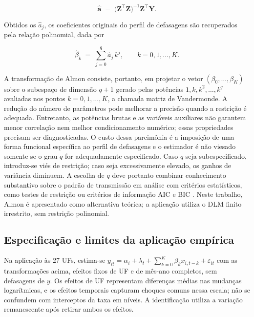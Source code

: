 \begin{equation}
    \hat{\boldsymbol{a}}
    \;=\;
    \bigl(\mathbf{Z}^{\!\top}\mathbf{Z}\bigr)^{-1}
    \mathbf{Z}^{\!\top}\mathbf{Y}.
    \label{eq:almon_ols}
\end{equation}
 
Obtidos os $\hat{a}_j$, os coeficientes originais do perfil de
defasagens são recuperados pela relação polinomial, dada por
 
\begin{equation}
    \hat{\beta}_k
    \;=\;
    \sum_{j=0}^{q} \hat{a}_j\, k^j,
    \qquad k = 0, 1, \ldots, K.
    \label{eq:almon_recovery}
\end{equation}
 
A transformação de Almon consiste, portanto, em projetar o vetor
$(\beta_0, \ldots, \beta_K)$ sobre o subespaço de dimensão $q + 1$
gerado pelas potências $1, k, k^2, \ldots, k^q$ avaliadas nos pontos
$k = 0, 1, \ldots, K$, a chamada matriz de Vandermonde. A redução do número de parâmetros pode melhorar a precisão quando a restrição é adequada. Entretanto, as potências brutas e as variáveis auxiliares não garantem menor correlação nem melhor condicionamento numérico; essas propriedades precisam ser diagnosticadas. O custo dessa parcimônia é a imposição
de uma forma funcional específica ao perfil de defasagens e o estimador
é não viesado somente se o grau $q$ for adequadamente especificado.
Caso $q$ seja subespecificado, introduz-se viés de restrição; caso
seja excessivamente elevado, os ganhos de variância diminuem. A
escolha de $q$ deve portanto combinar conhecimento substantivo sobre
o padrão de transmissão em análise com critérios estatísticos, como
testes de restrição ou critérios de informação AIC e BIC
\citep{judge1985, wooldridge2010}. Neste trabalho, Almon é apresentado como alternativa teórica; a aplicação utiliza o DLM finito irrestrito, sem restrição polinomial.


\subsection{Especificação e limites da aplicação empírica}
Na aplicação às 27 UFs, estima-se $y_{it}=\alpha_i+\lambda_t+\sum_{k=0}^{K}\beta_kx_{i,t-k}+\varepsilon_{it}$ com as transformações acima, efeitos fixos de UF e de mês-ano completos, sem defasagens de $y$. Os efeitos de UF representam diferenças médias nas mudanças logarítmicas, e os efeitos temporais capturam choques comuns nessa escala; não se confundem com interceptos da taxa em níveis. A identificação utiliza a variação remanescente após retirar ambos os efeitos.

